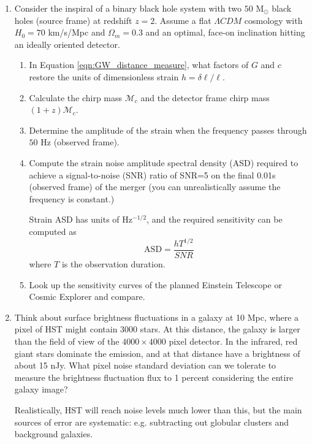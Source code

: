 \begin{enumerate}
\item
  Consider the inspiral of a binary black hole system with two $50$ M$_\odot$ black holes (source frame) at redshift $z=2$.  Assume a flat $\Lambda CDM$ cosmology with $H_0 = 70$ km/s/Mpc and $\Omega_m = 0.3$ and an optimal, face-on inclination hitting an ideally oriented detector.
  
  \begin{enumerate}
    \item In Equation \ref{eqn:GW_distance_measure}, what factors of $G$ and $c$ restore the units of dimensionless strain $h = \delta \ell/\ell$.

    \item Calculate the chirp mass $\mathcal{M}_c$ and the detector frame chirp mass $(1+z)\mathcal{M}_c$.

    \item Determine the amplitude of the strain when the frequency passes through $50$ Hz (observed frame).

    \item Compute the strain noise amplitude spectral density (ASD) required to achieve a signal-to-noise (SNR) ratio of SNR=5 on the final 0.01s (observed frame) of the merger (you can unrealistically assume the frequency is constant.)

      Strain ASD has units of Hz$^{-1/2}$, and the required sensitivity can be computed as
      $$ \mbox{ASD} = \frac{h T^{1/2}}{SNR} $$
      where $T$ is the observation duration.

    \item Look up the sensitivity curves of the planned Einstein Telescope or Cosmic Explorer and compare.      
  \end{enumerate}
  


\item  Think about surface brightness fluctuations in a galaxy at 10 Mpc, where a pixel of HST might contain 3000 stars. At this distance, the galaxy is larger than the field of view of the $4000 \times 4000$ pixel detector.  In the infrared, red giant stars dominate the emission, and at that distance have a brightness of about 15 nJy.  What pixel noise standard deviation can we tolerate to measure the brightness fluctuation flux to 1 percent considering the entire galaxy image?

  Realistically, HST will reach noise levels much lower than this, but the main sources of error are systematic: e.g. subtracting out globular clusters and background galaxies.



\end{enumerate}
